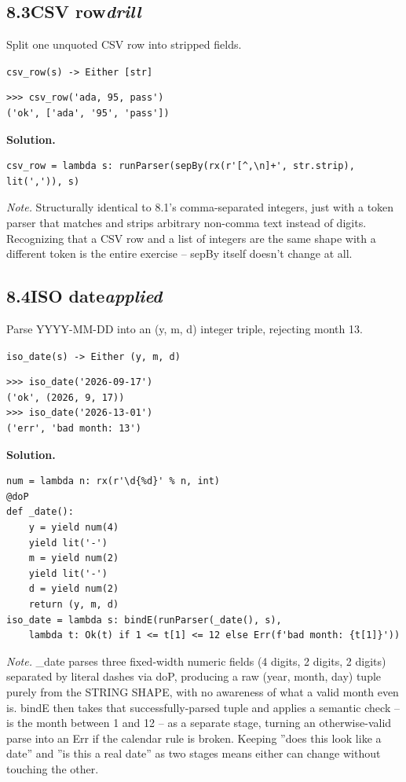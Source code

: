 \documentclass[10pt,letterpaper]{book}
\begin{document}
\subsection*{8.3\quad CSV row\hfill\textnormal{\textit{drill}}}
Split one unquoted CSV row into stripped fields.

\noindent\texttt{csv\_row(s) -> Either [str]}
\begin{lstlisting}[style=ex]
>>> csv_row('ada, 95, pass')
('ok', ['ada', '95', 'pass'])
\end{lstlisting}
\noindent\textbf{Solution.}
\begin{lstlisting}[style=code]
csv_row = lambda s: runParser(sepBy(rx(r'[^,\n]+', str.strip), lit(',')), s)
\end{lstlisting}
\noindent\textit{Note.} Structurally identical to 8.1's comma-separated integers, just with a token parser that matches and strips arbitrary non-comma text instead of digits. Recognizing that a CSV row and a list of integers are the same shape with a different token is the entire exercise -- sepBy itself doesn't change at all.

\subsection*{8.4\quad ISO date\hfill\textnormal{\textit{applied}}}
Parse YYYY-MM-DD into an (y, m, d) integer triple, rejecting month 13.

\noindent\texttt{iso\_date(s) -> Either (y, m, d)}
\begin{lstlisting}[style=ex]
>>> iso_date('2026-09-17')
('ok', (2026, 9, 17))
>>> iso_date('2026-13-01')
('err', 'bad month: 13')
\end{lstlisting}
\noindent\textbf{Solution.}
\begin{lstlisting}[style=code]
num = lambda n: rx(r'\d{%d}' % n, int)
@doP
def _date():
    y = yield num(4)
    yield lit('-')
    m = yield num(2)
    yield lit('-')
    d = yield num(2)
    return (y, m, d)
iso_date = lambda s: bindE(runParser(_date(), s),
    lambda t: Ok(t) if 1 <= t[1] <= 12 else Err(f'bad month: {t[1]}'))
\end{lstlisting}
\noindent\textit{Note.} \_date parses three fixed-width numeric fields (4 digits, 2 digits, 2 digits) separated by literal dashes via doP, producing a raw (year, month, day) tuple purely from the STRING SHAPE, with no awareness of what a valid month even is. bindE then takes that successfully-parsed tuple and applies a semantic check -- is the month between 1 and 12 -- as a separate stage, turning an otherwise-valid parse into an Err if the calendar rule is broken. Keeping ''does this look like a date'' and ''is this a real date'' as two stages means either can change without touching the other.
\end{document}
